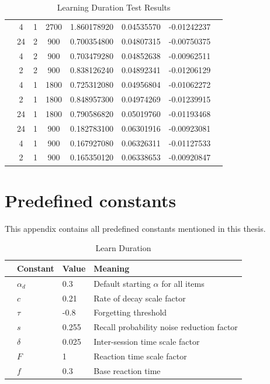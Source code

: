 \documentclass[a4paper]{report}
\begin{document}
\begin{table}[h]
{\begin{tabular}{l*{7}{c}}
         & 4            &     1         &     2700         & 1.860178920         &  0.04535570 & -0.01242237 \\
         & 24           &     2         &     900          & 0.700354800         &  0.04807315 & -0.00750375 \\
         & 4            &     2         &     900          & 0.703479280         &  0.04852638 & -0.00962511 \\
         & 2            &     2         &     900          & 0.838126240         &  0.04892341 & -0.01206129 \\
         & 4            &     1         &     1800         & 0.725312080         &  0.04956804 & -0.01062272 \\
         & 2            &     1         &     1800         & 0.848957300         &  0.04974269 & -0.01239915 \\
         & 24           &     1         &     1800         & 0.790586820         &  0.05019760 & -0.01193468 \\
         & 24           &     1         &     900          & 0.182783100         &  0.06301916 & -0.00923081 \\
         & 4            &     1         &     900          & 0.167927080         &  0.06326311 & -0.01127533 \\
         & 2            &     1         &     900          & 0.165350120         &  0.06338653 & -0.00920847 \\
		\bottomrule
	\end{tabular}
	}
	\caption{Learning Duration Test Results}
	\label{tab:learn_dur}
\end{table}


\chapter{Predefined constants}
\label{app:constants}
This appendix contains all predefined constants mentioned in this thesis.
\begin{table}[h]
	\centering\small
	\begin{tabular}{c*{3}{l}}
		\toprule
		& Constant         & Value  & Meaning \\
		\midrule
		 & $\alpha_d$      &  0.3   & Default starting $\alpha$ for all items \\
		 & $c$             &  0.21  & Rate of decay scale factor \\
		 & $\tau$          & -0.8   & Forgetting threshold \\
		 & $s$             &  0.255 & Recall probability noise reduction factor \\
		 & $\delta$        &  0.025 & Inter-session time scale factor \\
		 & $F$             &  1     & Reaction time scale factor \\
		 & $f$             &  0.3   & Base reaction time \\
		\bottomrule
	\end{tabular}
	\caption{Learn Duration}
	\label{tab:learn-duration}
\end{table}




\end{document}

